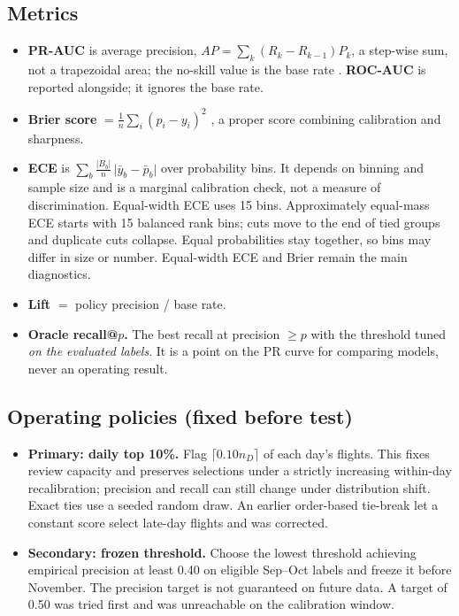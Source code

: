 \documentclass[conference]{IEEEtran}
\begin{document}
\subsection{Metrics}
\begin{itemize}
\item \textbf{PR-AUC} is average precision, $AP=\sum_k(R_k-R_{k-1})P_k$, a step-wise sum, not a trapezoidal area; the no-skill value is the base rate \cite{davis2006pr,saito2015pr}. \textbf{ROC-AUC} is reported alongside; it ignores the base rate.
\item \textbf{Brier score} $=\frac1n\sum_i(p_i-y_i)^2$ \cite{brier1950}, a proper score combining calibration and sharpness.
\item \textbf{ECE} \cite{guo2017calibration} is $\sum_b\frac{|B_b|}{n}\,\lvert\bar y_b-\bar p_b\rvert$ over probability bins. It depends on binning and sample size and is a marginal calibration check, not a measure of discrimination. Equal-width ECE uses 15 bins. Approximately equal-mass ECE starts with 15 balanced rank bins; cuts move to the end of tied groups and duplicate cuts collapse. Equal probabilities stay together, so bins may differ in size or number. Equal-width ECE and Brier remain the main diagnostics.
\item \textbf{Lift} $=$ policy precision / base rate.
\item \textbf{Oracle recall@$p$.} The best recall at precision $\ge p$ with the threshold tuned \emph{on the evaluated labels}. It is a point on the PR curve for comparing models, never an operating result.
\end{itemize}

\subsection{Operating policies (fixed before test)}
\begin{itemize}
\item \textbf{Primary: daily top 10\%.} Flag $\lceil0.10n_D\rceil$ of each day's flights. This fixes review capacity and preserves selections under a strictly increasing within-day recalibration; precision and recall can still change under distribution shift. Exact ties use a seeded random draw. An earlier order-based tie-break let a constant score select late-day flights and was corrected.
\item \textbf{Secondary: frozen threshold.} Choose the lowest threshold achieving empirical precision at least 0.40 on eligible Sep--Oct labels and freeze it before November. The precision target is not guaranteed on future data. A target of 0.50 was tried first and was unreachable on the calibration window.
\end{itemize}
\end{document}
